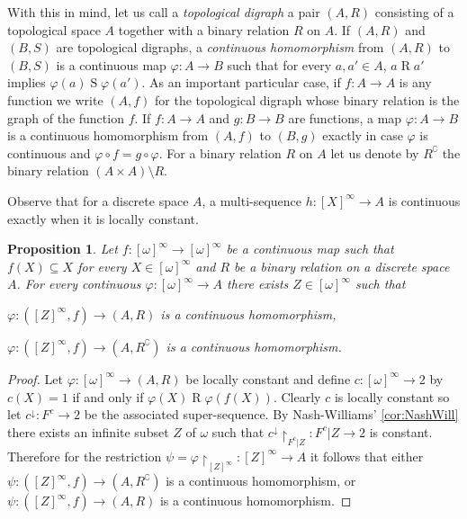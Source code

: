 \documentclass{article}%
\theoremstyle{plain}
\newtheorem{proposition}[theorem]{Proposition}
\theoremstyle{definition}
\theoremstyle{remark}
\newcommand{\restr}[1]{\mathord{\upharpoonright_{#1}}} %
\DeclareMathOperator{\dcl}{\downarrow}
\newcommand{\infSub}[1]{[#1]^{\infty}}
\begin{document}
With this in mind, let us call a \emph{topological digraph} a pair $(A,R)$ consisting of a topological space $A$ together with a binary relation $R$ on $A$. If $(A,R)$ and $(B,S)$ are topological digraphs, a \emph{continuous homomorphism} from $(A,R)$ to $(B,S)$ is a continuous map $\varphi:A\to B$ such that for every $a,a'\in A$, $a\mathrel{R}a'$ implies $\varphi(a)\mathrel{S}\varphi(a')$. As an important particular case, if $f:A\to A$ is any function we write $(A,f)$ for the topological digraph whose binary relation is the graph of the function $f$. If $f:A\to A$ and $g:B\to B$ are functions, a map $\varphi:A\to B$ is a continuous homomorphism from $(A,f)$ to $(B,g)$ exactly in case $\varphi$ is continuous and $\varphi\circ f=g\circ \varphi$. For a binary relation $R$ on $A$ let us denote by $R^{\complement}$ the binary relation $(A\times A)\setminus R$. 

Observe that for a discrete space $A$, a multi-sequence $h:\infSub{X}\to A$ is continuous exactly when it is locally constant.



\begin{proposition}\label{prop: DichtomyMultiseq}
Let $f:\infSub{\omega}\to\infSub{\omega}$ be a continuous map such that $f(X)\subseteq X$ for every $X\in\infSub{\omega}$ and $R$ be a binary relation on a discrete space $A$. For every continuous $\varphi:\infSub{\omega}\to A$ there exists $Z\in\infSub{\omega}$ such that
\begin{descThm}
\item[either] $\varphi: (\infSub{Z}, f)\to (A,R)$ is a continuous homomorphism,
\item[or] $\varphi:(\infSub{Z},f)\to (A,R^{\complement})$ is a continuous homomorphism.
\end{descThm}
\end{proposition}
\begin{proof}
Let $\varphi:\infSub{\omega}\to (A,R)$ be locally constant and define $c:\infSub{\omega}\to 2$ by $c(X)=1$ if and only if $\varphi(X)\mathrel{R}\varphi(f(X))$. Clearly $c$ is locally constant so let $c^{\dcl}:F^{c}\to 2$ be the associated super-sequence. By Nash-Williams' \cref{cor:NashWill} there exists an infinite subset $Z$ of $\omega$ such that $c^{\dcl}\restr{F^{c}|Z}:F^{c}|Z\to 2$ is constant. Therefore for the restriction $\psi=\varphi\restr{\infSub{Z}}:\infSub{Z}\to A$ it follows that either $\psi:(\infSub{Z},f)\to (A,R^{\complement})$ is a continuous homomorphism, or $\psi:(\infSub{Z},f)\to (A,R)$ is a continuous homomorphism.
\end{proof}
\end{document}
